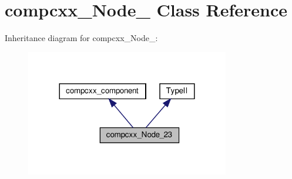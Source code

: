 \hypertarget{classcompcxx__Node__23}{}\section{compcxx\+\_\+\+Node\+\_ Class Reference}
\label{classcompcxx__Node__23}


Inheritance diagram for compcxx\+\_\+\+Node\+\_\+:\nopagebreak
\begin{figure}[H]
\begin{center}
\leavevmode
\includegraphics[width=252pt]{classcompcxx__Node__23__inherit__graph}
\end{center}
\end{figure}


